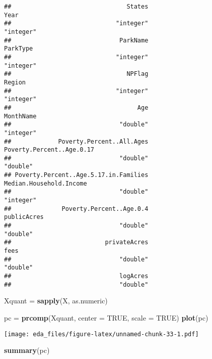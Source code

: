 \documentclass[
]{article}
\newenvironment{Shaded}{\begin{snugshade}}{\end{snugshade}}
\newcommand{\DataTypeTok}[1]{\textcolor[rgb]{0.13,0.29,0.53}{#1}}
\newcommand{\KeywordTok}[1]{\textcolor[rgb]{0.13,0.29,0.53}{\textbf{#1}}}
\newcommand{\NormalTok}[1]{#1}
\newcommand{\OtherTok}[1]{\textcolor[rgb]{0.56,0.35,0.01}{#1}}
\newcommand{\StringTok}[1]{\textcolor[rgb]{0.31,0.60,0.02}{#1}}
\begin{document}
\begin{verbatim}
##                                States                                  Year 
##                             "integer"                             "integer" 
##                              ParkName                              ParkType 
##                             "integer"                             "integer" 
##                                NPFlag                                Region 
##                             "integer"                             "integer" 
##                                   Age                             MonthName 
##                              "double"                             "integer" 
##             Poverty.Percent..All.Ages             Poverty.Percent..Age.0.17 
##                              "double"                              "double" 
## Poverty.Percent..Age.5.17.in.Families               Median.Household.Income 
##                              "double"                             "integer" 
##              Poverty.Percent..Age.0.4                           publicAcres 
##                              "double"                              "double" 
##                          privateAcres                                  fees 
##                              "double"                              "double" 
##                              logAcres 
##                              "double"
\end{verbatim}

\begin{Shaded}
\begin{Highlighting}[]
\NormalTok{Xquant =}\StringTok{ }\KeywordTok{sapply}\NormalTok{(X, as.numeric)}
\end{Highlighting}
\end{Shaded}

\begin{Shaded}
\begin{Highlighting}[]
\NormalTok{pc =}\StringTok{ }\KeywordTok{prcomp}\NormalTok{(Xquant, }\DataTypeTok{center =} \OtherTok{TRUE}\NormalTok{, }\DataTypeTok{scale =} \OtherTok{TRUE}\NormalTok{)}
\KeywordTok{plot}\NormalTok{(pc)}
\end{Highlighting}
\end{Shaded}

\texttt{[image: eda\_files/figure-latex/unnamed-chunk-33-1.pdf]}

\begin{Shaded}
\begin{Highlighting}[]
\KeywordTok{summary}\NormalTok{(pc)}
\end{Highlighting}
\end{Shaded}
\end{document}
